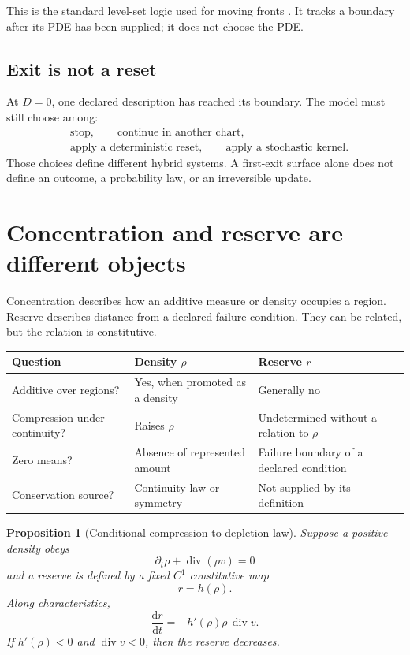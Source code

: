 \documentclass[11pt]{article}
\newtheorem{proposition}[theorem]{Proposition}
\theoremstyle{definition}
\theoremstyle{remark}
\newcommand{\dd}{\mathrm d}
\newcommand{\Div}{\operatorname{div}}
\begin{document}
This is the standard level-set logic used for moving fronts
\cite{OsherSethian1988}.  It tracks a boundary after its PDE has been
supplied; it does not choose the PDE.

\subsection{Exit is not a reset}

At \(D=0\), one declared description has reached its boundary.  The model
must still choose among:
\[
 \begin{aligned}
 &\text{stop},\qquad
 \text{continue in another chart},\\
 &\text{apply a deterministic reset},\qquad
 \text{apply a stochastic kernel}.
 \end{aligned}
\]
Those choices define different hybrid systems.  A first-exit surface alone
does not define an outcome, a probability law, or an irreversible update.

\section{Concentration and reserve are different objects}
\label{sec:concentration}

Concentration describes how an additive measure or density occupies a
region.  Reserve describes distance from a declared failure condition.
They can be related, but the relation is constitutive.

\begin{center}
\begin{tabularx}{\textwidth}{@{}L{0.23\textwidth}Y Y@{}}
\toprule
Question & Density \(\rho\) & Reserve \(r\) \\
\midrule
Additive over regions?
& Yes, when promoted as a density
& Generally no\\

Compression under continuity?
& Raises \(\rho\)
& Undetermined without a relation to \(\rho\)\\

Zero means?
& Absence of represented amount
& Failure boundary of a declared condition\\

Conservation source?
& Continuity law or symmetry
& Not supplied by its definition\\
\bottomrule
\end{tabularx}
\end{center}

\begin{proposition}[Conditional compression-to-depletion law]
\label{prop:constitutive}
Suppose a positive density obeys
\[
 \partial_t\rho+\Div(\rho v)=0
\]
and a reserve is defined by a fixed \(C^1\) constitutive map
\[
 r=h(\rho).
\]
Along characteristics,
\[
 \frac{\dd r}{\dd t}
=
-h'(\rho)\rho\,\Div v.
\]
If \(h'(\rho)<0\) and \(\Div v<0\), then the reserve decreases.
\end{proposition}
\end{document}
